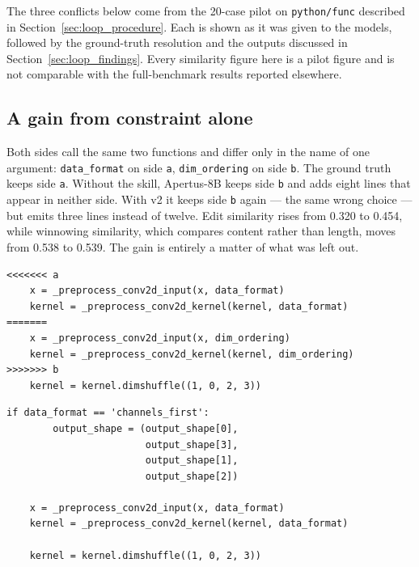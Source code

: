 The three conflicts below come from the 20-case pilot on \texttt{python/func}
described in Section~\ref{sec:loop_procedure}. Each is shown as it was given to
the models, followed by the ground-truth resolution and the outputs discussed in
Section~\ref{sec:loop_findings}. Every similarity figure here is a pilot figure
and is not comparable with the full-benchmark results reported elsewhere.

\subsection{A gain from constraint alone}

Both sides call the same two functions and differ only in the name of one
argument: \texttt{data\_format} on side \texttt{a}, \texttt{dim\_ordering} on side
\texttt{b}. The ground truth keeps side \texttt{a}. Without the skill, Apertus-8B
keeps side \texttt{b} and adds eight lines that appear in neither side. With v2 it
keeps side \texttt{b} again --- the same wrong choice --- but emits three lines
instead of twelve. Edit similarity rises from 0.320 to 0.454, while winnowing
similarity, which compares content rather than length, moves from 0.538 to 0.539.
The gain is entirely a matter of what was left out.

%

\begin{lstlisting}[style=conflictcode,title={\textbf{The conflict} (\texttt{0x96d20e6c9b0f2395})}]
<<<<<<< a
    x = _preprocess_conv2d_input(x, data_format)
    kernel = _preprocess_conv2d_kernel(kernel, data_format)
=======
    x = _preprocess_conv2d_input(x, dim_ordering)
    kernel = _preprocess_conv2d_kernel(kernel, dim_ordering)
>>>>>>> b
    kernel = kernel.dimshuffle((1, 0, 2, 3))
\end{lstlisting}

\begin{lstlisting}[style=conflictcode,title={\textbf{Ground-truth resolution} (10 lines, 359 characters)}]
    if data_format == 'channels_first':
        output_shape = (output_shape[0],
                        output_shape[3],
                        output_shape[1],
                        output_shape[2])

    x = _preprocess_conv2d_input(x, data_format)
    kernel = _preprocess_conv2d_kernel(kernel, data_format)

    kernel = kernel.dimshuffle((1, 0, 2, 3))
\end{lstlisting}


